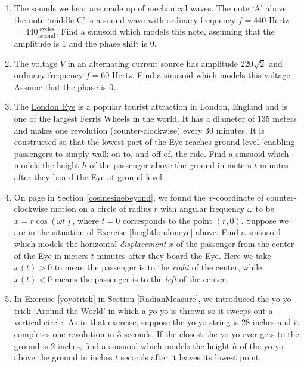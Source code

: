 \begin{enumerate}

\setcounter{enumi}{\value{HW}}

\item  The sounds we hear are made up of mechanical waves.  The note `A' above the note `middle C' is a sound wave with ordinary frequency $f = 440$ Hertz $= 440 \frac{\text{cycles}}{\text{second}}$.  Find a sinusoid which models this note, assuming that the amplitude is $1$ and the phase shift is $0$.

\item The voltage $V$ in an alternating current source has amplitude $220 \sqrt{2}$ and ordinary frequency $f = 60$ Hertz.  Find a sinusoid which models this voltage.  Assume that the phase is $0$.


\item \label{heightlondoneye} The \href{http://en.wikipedia.org/wiki/London_Eye}{\underline{London Eye}} is a popular tourist attraction in London, England and is one of the largest Ferris Wheels in the world.  It has a diameter of 135 meters and makes one revolution (counter-clockwise) every 30 minutes.  It is constructed so that the lowest part of the Eye reaches ground level, enabling passengers to simply walk on to, and off of, the ride.  Find a sinsuoid which models the height $h$ of the passenger above the ground in meters $t$ minutes after they board the Eye at ground level.

\item \label{leftrightlondoneye} On page \pageref{equationsforcircularmotion} in Section \ref{cosinesinebeyond}, we found the $x$-coordinate of counter-clockwise motion on a circle of radius $r$ with angular frequency $\omega$ to be $x = r\cos(\omega t)$, where $t=0$ corresponds to the point $(r,0)$.  Suppose we are in the situation of Exercise \ref{heightlondoneye} above.  Find a sinsusoid which models the horizontal \textit{displacement} $x$ of the passenger from the center of the Eye in meters $t$ minutes after they board the Eye.  Here we take $x(t) > 0$ to mean the passenger is to the \textit{right} of the center, while $x(t) < 0$ means the passenger is to the \textit{left} of the center.

\item  In Exercise \ref{yoyotrick} in Section \ref{RadianMeasure}, we introduced the yo-yo trick `Around the World' in which a yo-yo is thrown so it sweeps out a vertical circle.  As in that exercise, suppose the yo-yo string is 28 inches and it completes one revolution in 3 seconds.  If the closest the yo-yo ever gets to the ground is 2 inches, find a sinsuoid which models the height $h$ of the yo-yo above the ground in inches $t$ seconds after it leaves its lowest point.




\end{enumerate}
